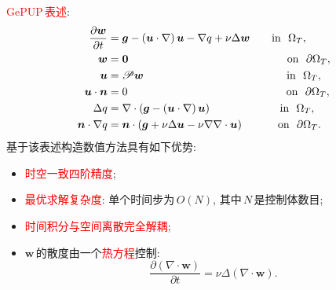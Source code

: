\documentclass{beamer}
\begin{document}
\begin{CJK*}{UTF8}{gkai}
  \begin{frame}
    \textcolor{red}{GePUP\,表述}:
    \begin{subequations}
      \label{eq:GePUP}
      \begin{align}
        \frac{\partial\bm{w}}{\partial t}
        &= \bm{g} -\left(\bm{u}\cdot\nabla\right)\bm{u}
          -\nabla q
          + \nu\Delta\bm{w}
          \qquad \textrm{in }\  \Omega_T,
        \\
        \bm{w} & = \bm{0}
                 \hspace{51mm} \textrm{on }\ \partial \Omega_T,
        \\
        \bm{u} &= \mathscr{P} \bm{w}
                 \hspace{46mm} \textrm{in }\  \Omega_T,
        \\
        \bm{u}\cdot \bm{n} & = 0 
                             \hspace{51mm} \textrm{on }\ \partial \Omega_T,
        \\
        \Delta q &= \nabla\cdot \left(
                   \bm{g} -\left(\bm{u}\cdot\nabla\right)\bm{u}
                   \right)
                   \hspace{22mm} \textrm{in }\  \Omega_T,
        \\
        \bm{n}\cdot\nabla q
        &= \bm{n}\cdot \left(
          \bm{g} + \nu\Delta\bm{u}-\nu\nabla\nabla\cdot\bm{u}
          \right) \hspace{11mm} \textrm{on }\ \partial \Omega_T.
      \end{align}
    \end{subequations}
    基于该表述构造数值方法具有如下优势:
    \begin{itemize}
    \item
      \textcolor{red}{时空一致四阶精度};
    \item
      \textcolor{red}{最优求解复杂度}:
      单个时间步为\,$O(N)$,
      其中\,$N$\,是控制体数目;
    \item
      \textcolor{red}{时间积分与空间离散完全解耦};
    \item
      $\bm{w}$\,的散度由一个\textcolor{red}{热方程}控制:
      \begin{equation*}
        \frac{\partial \left( \nabla\cdot\bm{w} \right)}{\partial t} = \nu\Delta \left( \nabla\cdot \bm{w} \right).
      \end{equation*}
    \end{itemize}
  \end{frame}


\end{CJK*}
\end{document}
